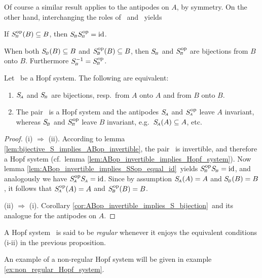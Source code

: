 \vspace{2ex}

Of course a similar result applies to the antipodes on $A$, by symmetry.
On the other hand, interchanging the roles of \pairAB\ and \pairABop\ yields

\begin{cor_sec}
If\/ $S_{\scriptscriptstyle \! B}^{\rm op}(B) \subseteq B$, then\/ $S_{\scriptscriptstyle \! B} S_{\scriptscriptstyle \! B}^{\rm op} = \mbox{\rm id}$.
\end{cor_sec}

\begin{cor_sec}  \label{cor:ABop_invertible_implies_S_bijection}
When both\/ $S_{\scriptscriptstyle \! B}(B) \subseteq B$ and\/ $S_{\scriptscriptstyle \! B}^{\rm op}(B) \subseteq B$,
then\/ $S_{\scriptscriptstyle \! B}$ and\/ $S_{\scriptscriptstyle \! B}^{\rm op}$ are bijections from\/ $B$ onto\/ $B$.
Furthermore\/ $S_{\scriptscriptstyle \! B}^{-1} = S_{\scriptscriptstyle \! B}^{\rm op}$.
\end{cor_sec}



\begin{prop_sec} \label{prop:regular:hs}
Let\/ \pairAB\ be a Hopf system. The following are equivalent:
\begin{enumerate}
\item
$S_{\scriptscriptstyle \! A}$ and\/ $S_{\scriptscriptstyle \! B}$ are bijections,
resp.\ from\/ $A$ onto\/ $A$ and from\/ $B$ onto\/ $B$.
\item
The pair \pairABop\ is a Hopf system and the antipodes\/
$S_{\scriptscriptstyle \! A}$ and\/ $S_{\scriptscriptstyle \! A}^{\rm op}$ leave\/ $A$ invariant, whereas\/ $S_{\scriptscriptstyle \! B}$ and\/ $S_{\scriptscriptstyle \! B}^{\rm op}$
leave\/ $B$ invariant, e.g.\ $S_{\scriptscriptstyle \! A}(A) \subseteq A$, etc.
\end{enumerate}
\end{prop_sec}

\begin{proof}
(i) $\Rightarrow$ (ii).
According to lemma \ref{lem:bijective_S_implies_ABop_invertible},
the pair \pairABop\ is invertible, and therefore a Hopf system
(cf.\ lemma \ref{lem:ABop_invertible_implies_Hopf_system}).
Now lemma \ref{lem:ABop_invertible_implies_SSop_equal_id}\
yields $S_{\scriptscriptstyle \! B}^{\rm op} S_{\scriptscriptstyle \! B} = \mbox{\rm id}$, and analogously we have $S_{\scriptscriptstyle \! A}^{\rm op} S_{\scriptscriptstyle \! A} = \mbox{\rm id}$.
Since by assumption $S_{\scriptscriptstyle \! A}(A)=A$ and $S_{\scriptscriptstyle \! B}(B)=B$, it follows that
$S_{\scriptscriptstyle \! A}^{\rm op}(A) = A$ and $S_{\scriptscriptstyle \! B}^{\rm op}(B) = B$.

(ii) $\Rightarrow$ (i). Corollary \ref{cor:ABop_invertible_implies_S_bijection}\
and its analogue for the antipodes on $A$.
\end{proof}


\begin{defn_sec} \label{def:regular:hs}
A Hopf system \pairAB\ is said to be {\em regular\/} whenever it enjoys
the equivalent conditions (i-ii) in the previous proposition.
\end{defn_sec}

An example of a non-regular Hopf system will be given in example
\ref{ex:non_regular_Hopf_system}\@.
